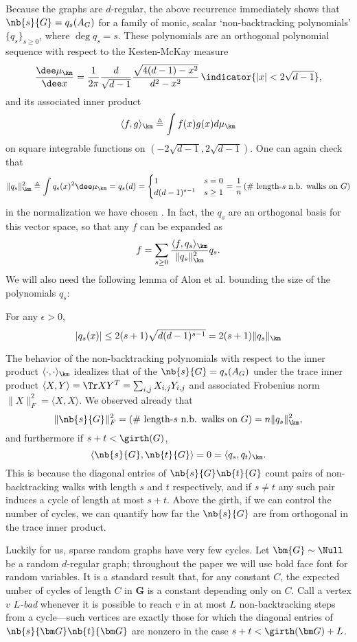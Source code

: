 Because the graphs are $d$-regular, the above recurrence immediately shows that $\nb{s}{G} = q_s(A_{G})$ for a family of monic, scalar `non-backtracking polynomials' $\{q_s\}_{s\ge 0}$, where $\deg q_s = s$. These polynomials are an orthogonal polynomial sequence with respect to the Kesten-McKay measure
\[
	\frac{\dee\mu_{\km}}{\dee x} = \frac{1}{2\pi} \frac{d}{\sqrt{d-1}} \frac{\sqrt{4(d-1) - x^2}}{d^2 - x^2}\,\indicator{|x|< 2\sqrt{d-1}},
\]
and its associated inner product 
$$
    \langle f,g \rangle_{\km} \triangleq \int f(x)g(x) d\mu_{\km}
$$
on square integrable functions on $(-2\sqrt{d-1},2\sqrt{d-1})$. One can again check that
\[
	\|q_s\|_\km^2 \triangleq \int q_s(x)^2\dee\mu_{\km} = q_s(d) =  \begin{cases} 1 & s = 0 \\ d(d-1)^{s-1} & s \ge 1 \end{cases} = \frac{1}{n}\left(\text{\# length-$s$ n.b. walks on $G$}\right)
\]
in the normalization we have chosen \cite{alon2007non}. In fact, the $q_s$ are an orthogonal basis for this vector space, so that any $f$ can be expanded as
$$
    f = \sum_{s \ge 0} \frac{\langle f, q_s \rangle_{\km}}{\|q_s\|^2_{\km}} q_s.
$$
We will also need the following lemma of Alon et al. \cite[Lemma 2.3]{alon2007non} bounding the size of the polynomials $q_s$:
\begin{lemma}   \label{lem:NBW-poly-bound}
    For any $\epsilon>0$,
    $$
        |q_s(x)| \le 2(s+1)\sqrt{d(d-1)^{s-1}} = 2(s+1)\|q_s\|_{\km}
    $$
\end{lemma}

The behavior of the non-backtracking polynomials with respect to the inner product $\langle \cdot,\cdot \rangle_{\km}$ idealizes that of the $\nb{s}{G} = q_s(A_{G})$ under the trace inner product $\langle X,Y \rangle = \Tr XY^T = \sum_{i,j}X_{i,j}Y_{i,j}$ and associated Frobenius norm $\|X\|_F^2 = \langle X,X \rangle$. We observed already that
$$
    \|\nb{s}{G}\|_F^2 = \left(\text{\# length-$s$ n.b. walks on $G$}\right) = n\|q_s\|_{\km}^2,
$$
and furthermore if $s + t < \girth(G)$,
$$
    \langle \nb{s}{G},\nb{t}{G} \rangle = 0 = \langle q_s,q_t \rangle_{\km}.
$$
This is because the diagonal entries of $\nb{s}{G}\nb{t}{G}$ count pairs of non-backtracking walks with length $s$ and $t$ respectively, and if $s\neq t$ any such pair induces a cycle of length at most $s+t$. Above the girth, if we can control the number of cycles, we can quantify how far the $\nb{s}{G}$ are from orthogonal in the trace inner product.

Luckily for us, sparse random graphs have very few cycles. Let $\bm{G} \sim \Null$ be a random $d$-regular graph; throughout the paper we will use bold face font for random variables. It is a standard result that, for any constant $C$, the expected umber of cycles of length $C$ in $\bm G$ is a constant depending only on $C$. Call a vertex $v$ \emph{$L$-bad} whenever it is possible to reach $v$ in at most $L$ non-backtracking steps from a cycle---such vertices are exactly those for which the diagonal entries of $\nb{s}{\bm G}\nb{t}{\bm G}$ are nonzero in the case $s + t < \girth(\bm G) + L$. 

